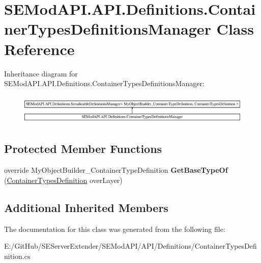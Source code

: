 \hypertarget{class_s_e_mod_a_p_i_1_1_a_p_i_1_1_definitions_1_1_container_types_definitions_manager}{}\section{S\+E\+Mod\+A\+P\+I.\+A\+P\+I.\+Definitions.\+Container\+Types\+Definitions\+Manager Class Reference}
\label{class_s_e_mod_a_p_i_1_1_a_p_i_1_1_definitions_1_1_container_types_definitions_manager}
Inheritance diagram for S\+E\+Mod\+A\+P\+I.\+A\+P\+I.\+Definitions.\+Container\+Types\+Definitions\+Manager\+:\begin{figure}[H]
\begin{center}
\leavevmode
\includegraphics[height=1.471748cm]{class_s_e_mod_a_p_i_1_1_a_p_i_1_1_definitions_1_1_container_types_definitions_manager}
\end{center}
\end{figure}
\subsection*{Protected Member Functions}
\begin{DoxyCompactItemize}
\item 
\hypertarget{class_s_e_mod_a_p_i_1_1_a_p_i_1_1_definitions_1_1_container_types_definitions_manager_a1e7df7ca56a3175002159a454bd7c91f}{}override My\+Object\+Builder\+\_\+\+Container\+Type\+Definition {\bfseries Get\+Base\+Type\+Of} (\hyperlink{class_s_e_mod_a_p_i_1_1_a_p_i_1_1_definitions_1_1_container_types_definition}{Container\+Types\+Definition} over\+Layer)\label{class_s_e_mod_a_p_i_1_1_a_p_i_1_1_definitions_1_1_container_types_definitions_manager_a1e7df7ca56a3175002159a454bd7c91f}

\end{DoxyCompactItemize}
\subsection*{Additional Inherited Members}


The documentation for this class was generated from the following file\+:\begin{DoxyCompactItemize}
\item 
E\+:/\+Git\+Hub/\+S\+E\+Server\+Extender/\+S\+E\+Mod\+A\+P\+I/\+A\+P\+I/\+Definitions/Container\+Types\+Definition.\+cs\end{DoxyCompactItemize}
